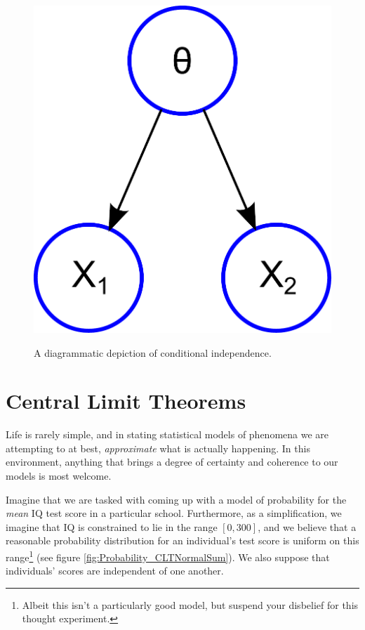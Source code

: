 \documentclass[11pt,fullpage]{book}
\begin{document}
\begin{figure}
\centering
\scalebox{0.4} 
{\includegraphics{Probability_conditionalIndependence.pdf}}
\caption{A diagrammatic depiction of conditional independence.}\label{fig:Probability_conditionalIndependence}
\end{figure}

\section{Central Limit Theorems}\label{sec:Probability_CLT}
Life is rarely simple, and in stating statistical models of phenomena we are attempting to at best, \textit{approximate} what is actually happening. In this environment, anything that brings a degree of certainty and coherence to our models is most welcome. 

Imagine that we are tasked with coming up with a model of probability for the \textit{mean} IQ test score in a particular school. Furthermore, as a simplification, we imagine that IQ is constrained to lie in the range $\left[0,300\right]$, and we believe that a reasonable probability distribution for an individual's test score is uniform on this range\footnote{Albeit this isn't a particularly good model, but suspend your disbelief for this thought experiment.} (see figure \ref{fig:Probability_CLTNormalSum}). We also suppose that individuals' scores are independent of one another.
\end{document}
